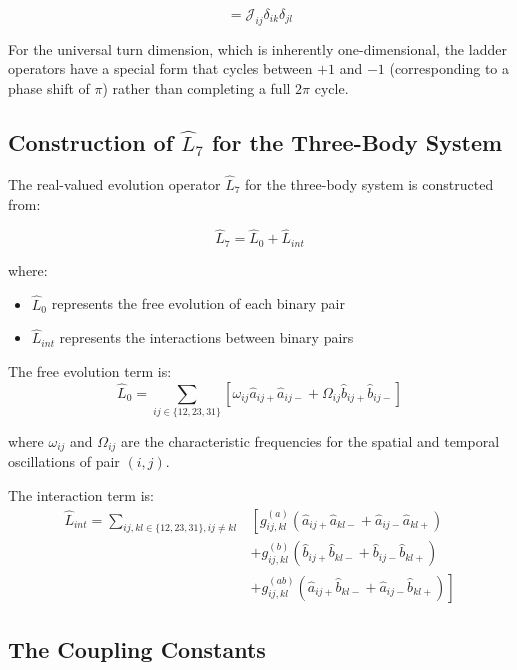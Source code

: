 \documentclass{article}
\begin{document}
\begin{equation}
[\hat{b}_{ij+}, \hat{b}_{kl-}] = \mathcal{J}_{ij} \delta_{ik}\delta_{jl}
\end{equation}

For the universal turn dimension, which is inherently one-dimensional, the ladder operators have a special form that cycles between $+1$ and $-1$ (corresponding to a phase shift of $\pi$) rather than completing a full $2\pi$ cycle.

\subsection{Construction of $\hat{L}_7$ for the Three-Body System}

The real-valued evolution operator $\hat{L}_7$ for the three-body system is constructed from:

\begin{equation}
\hat{L}_7 = \hat{L}_0 + \hat{L}_{int}
\end{equation}

where:
\begin{itemize}
\item $\hat{L}_0$ represents the free evolution of each binary pair
\item $\hat{L}_{int}$ represents the interactions between binary pairs
\end{itemize}

The free evolution term is:
\begin{equation}
\hat{L}_0 = \sum_{ij \in \{12,23,31\}} \left[ \omega_{ij} \hat{a}_{ij+}\hat{a}_{ij-} + \Omega_{ij} \hat{b}_{ij+}\hat{b}_{ij-} \right]
\end{equation}

where $\omega_{ij}$ and $\Omega_{ij}$ are the characteristic frequencies for the spatial and temporal oscillations of pair $(i,j)$.

The interaction term is:
\begin{align}
\hat{L}_{int} = \sum_{ij,kl \in \{12,23,31\}, ij \neq kl} &\left[ g_{ij,kl}^{(a)} (\hat{a}_{ij+}\hat{a}_{kl-} + \hat{a}_{ij-}\hat{a}_{kl+}) \right.\\
&+ \left. g_{ij,kl}^{(b)} (\hat{b}_{ij+}\hat{b}_{kl-} + \hat{b}_{ij-}\hat{b}_{kl+}) \right.\\
&+ \left. g_{ij,kl}^{(ab)} (\hat{a}_{ij+}\hat{b}_{kl-} + \hat{a}_{ij-}\hat{b}_{kl+}) \right]
\end{align}

\subsection{The Coupling Constants}
\end{document}
